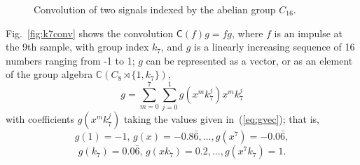 \documentclass[reqno,onecolumn,oneside]{paper}
\newcommand{\<}{\ensuremath{\langle}}
\renewcommand{\>}{\ensuremath{\rangle}}
\newcommand{\sdp}{\ensuremath{\rtimes}}
\newcommand{\field}[1]{\ensuremath{\mathbb{#1}}}
\newcommand{\C}{\field{C}}                   %
\newcommand{\lt}[1]{\ensuremath{\mathsf{#1}}}
\begin{document}
\begin{figure}
\centerline{}
\caption{Convolution of two signals indexed by the abelian
  group $C_{16}$.}
\label{fig:C16conv}
\end{figure}

Fig.~\ref{fig:k7conv} shows the convolution $\lt{C}(f)g = fg$,
where $f$ is an impulse at the 9th sample, with group index $k_7$, and
$g$ is a linearly increasing sequence of 16 numbers ranging
from -1 to 1; $g$ can be represented as a vector,
or as an element of the group algebra $\C(C_8 \sdp \{1, k_7\})$,
\[
g = \sum_{m=0}^7 \sum_{j=0}^1 g(x^mk_7^j) x^mk_7^j
\]
with coefficients $g(x^mk_7^j)$ taking the values given
in~(\ref{eq:gvec}); that is,
\[
g(1)=-1, \, g(x)=-0.8\bar{6}, %
\ldots, g(x^7)=-0.0\bar{6},
\]
\[
g(k_7)=0.0\bar{6}, \, g(x k_7)=0.2, \ldots, g(x^7 k_7) = 1.
\]
\end{document}
